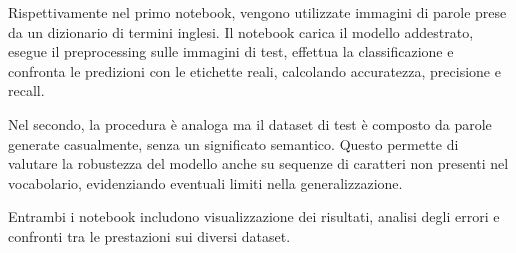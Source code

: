 Rispettivamente nel primo notebook, vengono utilizzate immagini di parole prese da un dizionario di termini inglesi. Il notebook carica il modello addestrato, esegue il preprocessing sulle immagini di test, effettua la classificazione e confronta le predizioni con le etichette reali, calcolando accuratezza, precisione e recall.

Nel secondo, la procedura è analoga ma il dataset di test è composto da parole generate casualmente, senza un significato semantico. Questo permette di valutare la robustezza del modello anche su sequenze di caratteri non presenti nel vocabolario, evidenziando eventuali limiti nella generalizzazione.

Entrambi i notebook includono visualizzazione dei risultati, analisi degli errori e confronti tra le prestazioni sui diversi dataset.